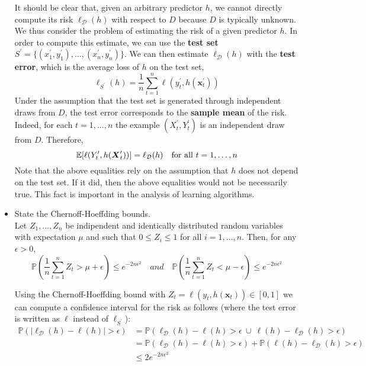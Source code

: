 \begin{itemize}
        It should be clear that, given an arbitrary predictor $h$, we cannot directly compute its risk $\ell_{\mathcal{D}}(h)$ with respect to $D$ because $D$ is typically unknown.
        We thus consider the problem of estimating the risk of a given predictor $h$. In order to compute this estimate, we can use the \textbf{test set} $S^\prime = \{(x^\prime_{1} , y^\prime_{1}), \dots , (x^\prime_{n}, y^\prime_{n})\}$. We can then estimate $\ell_{\mathcal{D}}(h)$ with the \textbf{test error}, which is the average loss of $h$ on the test set,
        $$
        \ell_{S^\prime}(h) = \frac{1}{n}\sum_{t=1}^{n} \ell(y^\prime_{t}, h(\boldsymbol{x}^\prime_{t}))
        $$
        Under the assumption that the test set is generated through independent draws from $D$, the test error corresponds to the \textbf{sample mean} of the risk. Indeed, for each $t = 1, \dots, n$ the example $(X^\prime_{t} , Y^\prime_{t})$ is an independent draw from $D$. Therefore,
        $$
        \mathbb{E}[\ell(Y^\prime_{t}, h(\boldsymbol{X}^\prime_{t}))] = \ell_{\mathcal{D}}(h) \quad \textmd{for all}\ t = 1, \dots, n
        $$
        Note that the above equalities rely on the assumption that $h$ does not depend on the test set. If it did, then the above equalities would not be necessarily true. This fact is important in the analysis of learning algorithms.

    
    \item State the Chernoff-Hoeffding bounds.\\

        Let $Z_1, \dots, Z_n$ be indipendent and identically distributed random variables with expectation $\mu$ and such that $0 \leq Z_i \leq 1$ for all $i = 1, \dots, n$. Then, for any $\epsilon > 0$,
        $$
        \mathbb{P}\left(\frac{1}{n}\sum_{t=1}^{n} Z_t > \mu + \epsilon\right) \leq e^{-2n\epsilon^{2}}
        \quad and \quad
        \mathbb{P}\left(\frac{1}{n}\sum_{t=1}^{n} Z_t < \mu - \epsilon\right) \leq e^{-2n\epsilon^{2}}
        $$

        Using the Chernoff-Hoeffding bound with $Z_t = \ell(y_t, h(\boldsymbol{x}_t)) \in [0, 1]$ we can compute a confidence interval for the risk as follows (where the test error is written as $\ell$ instead of $\ell_{S^\prime}$):
        \begin{equation} 
            \begin{split}
                \mathbb{P}\left(|\ell_{\mathcal{D}}(h) - \ell(h)| > \epsilon\right) & = \mathbb{P}\left(\ell_{\mathcal{D}}(h) - \ell(h) > \epsilon\ \cup\ \ell(h) - \ell_{\mathcal{D}}(h) > \epsilon\right)\\ 
                                                                                    & = \mathbb{P}\left(\ell_{\mathcal{D}}(h) - \ell(h) > \epsilon\right) + \mathbb{P}\left(\ell(h) - \ell_{\mathcal{D}}(h) > \epsilon\right)\\ 
                                                                                    & \leq 2e^{-2n\epsilon^{2}}\\
            \end{split}
        \end{equation}


\end{itemize}
